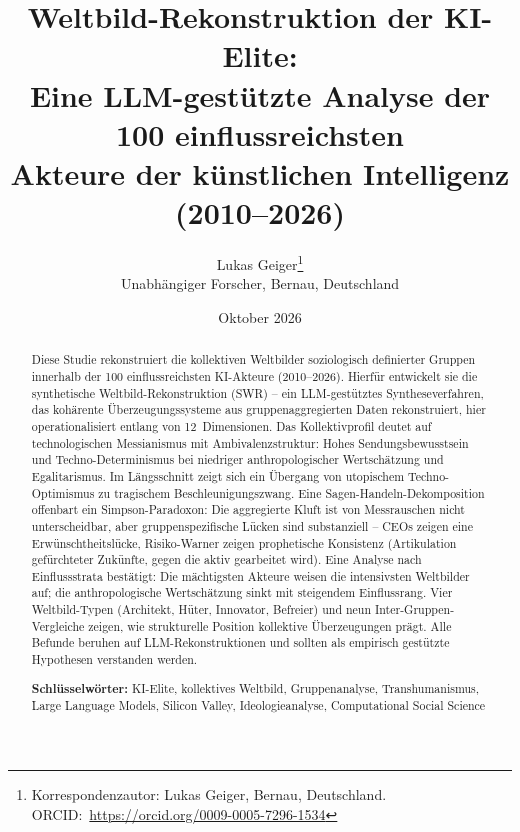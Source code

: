 \documentclass[12pt,a4paper]{article}
\title{%
  \sffamily\bfseries
  Weltbild-Rekonstruktion der KI-Elite:\\[0.3em]
  \large Eine LLM-gestützte Analyse der 100 einflussreichsten\\
  Akteure der künstlichen Intelligenz (2010--2026)%
}
\author{%
  Lukas Geiger\thanks{Korrespondenzautor: Lukas Geiger, Bernau, Deutschland. ORCID:~\url{https://orcid.org/0009-0005-7296-1534}}\\[0.3em]
  \small Unabhängiger Forscher, Bernau, Deutschland
}
\date{Oktober 2026}
\begin{document}


\maketitle
\thispagestyle{empty}

\begin{abstract}
\noindent
Diese Studie rekonstruiert die kollektiven Weltbilder soziologisch definierter Gruppen innerhalb der 100 einflussreichsten KI-Akteure (2010--2026). Hierfür entwickelt sie die synthetische Weltbild-Rekonstruktion (SWR) -- ein LLM-gestütztes Syntheseverfahren, das kohärente Überzeugungssysteme aus gruppenaggregierten Daten rekonstruiert, hier operationalisiert entlang von 12~Dimensionen. Das Kollektivprofil deutet auf \glqq technologischen Messianismus mit Ambivalenzstruktur\grqq: Hohes Sendungsbewusstsein und Techno-Determinismus bei niedriger anthropologischer Wertschätzung und Egalitarismus. Im Längsschnitt zeigt sich ein Übergang von utopischem Techno-Optimismus zu tragischem Beschleunigungszwang. Eine Sagen-Handeln-Dekomposition offenbart ein Simpson-Paradoxon: Die aggregierte Kluft ist von Messrauschen nicht unterscheidbar, aber gruppenspezifische Lücken sind substanziell -- CEOs zeigen eine Erwünschtheitslücke, Risiko-Warner zeigen prophetische Konsistenz (Artikulation gefürchteter Zukünfte, gegen die aktiv gearbeitet wird). Eine Analyse nach Einflussstrata bestätigt: Die mächtigsten Akteure weisen die intensivsten Weltbilder auf; die anthropologische Wertschätzung sinkt mit steigendem Einflussrang. Vier Weltbild-Typen (Architekt, Hüter, Innovator, Befreier) und neun Inter-Gruppen-Vergleiche zeigen, wie strukturelle Position kollektive Überzeugungen prägt. Alle Befunde beruhen auf LLM-Rekonstruktionen und sollten als empirisch gestützte Hypothesen verstanden werden.

\medskip
\noindent\textbf{Schlüsselwörter:} KI-Elite, kollektives Weltbild, Gruppenanalyse, Transhumanismus, Large Language Models, Silicon Valley, Ideologieanalyse, Computational Social Science
\end{abstract}

\clearpage
{}
{}
\tableofcontents
\clearpage
{}

\end{document}
